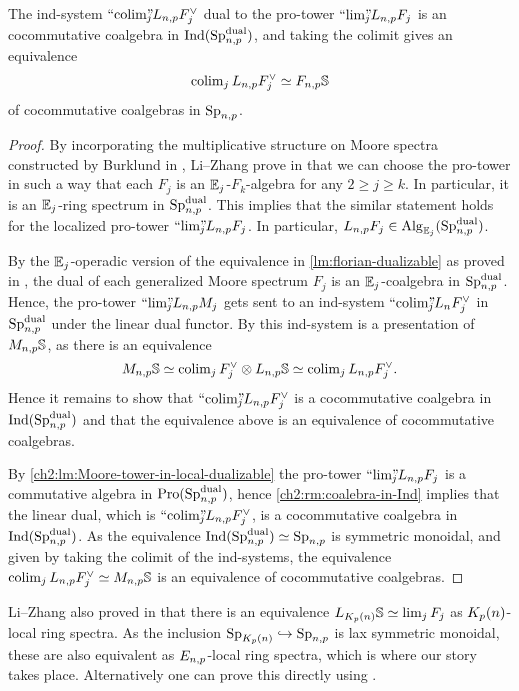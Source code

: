 \begin{lemma}
    \label{ch2:lm:coalgebra-ind-presentation-of-monochromatic-sphere}
    The ind-system $``\!\operatorname{colim}\!"_{\hspace{-5pt} j} L_{n,p} F_j^\vee$ dual to the pro-tower $``\!\lim\!"_{\hspace{-5pt} j} L_{n,p} F_j$ is an cocommutative coalgebra in $\operatorname{Ind}(\mathrm{Sp}_{n,p}^{\mathrm{dual}})$, and taking the colimit gives an equivalence 
    \[\operatorname{colim}_j L_{n,p} F_j^\vee \simeq F_{n,p}\mathbb{S}\] 
    of cocommutative coalgebras in $\mathrm{Sp}_{n,p}$. 
\end{lemma}
\begin{proof}
    By incorporating the multiplicative structure on Moore spectra constructed by Burklund in \cite{burklund_2022}, Li--Zhang prove in \cite[2.1.4]{li-zhang_2023} that we can choose the pro-tower in such a way that each $F_j$ is an $\mathbb{E}_j$-$F_k$-algebra for any $2\geq j \geq k$. In particular, it is an $\mathbb{E}_j$-ring spectrum in $\mathrm{Sp}_{n,p}^{\mathrm{dual}}$. This implies that the similar statement holds for the localized pro-tower $``\!\lim\!"_{\hspace{-5pt} j} L_{n,p} F_j$. In particular, $L_{n,p} F_j \in \operatorname{Alg}_{\mathbb{E}_j}(\mathrm{Sp}_{n,p}^{\mathrm{dual}})$. 
    
    By the $\mathbb{E}_j$-operadic version of the equivalence in \cref{lm:florian-dualizable} as proved in \cite[2.21]{peroux_2022}, the dual of each generalized Moore spectrum $F_j$ is an $\mathbb{E}_j$-coalgebra in $\mathrm{Sp}_{n,p}^{\mathrm{dual}}$. Hence, the pro-tower $``\!\lim\!"_{\hspace{-5pt} j} L_{n,p} M_j$ gets sent to an ind-system $``\!\operatorname{colim}\!"_{\hspace{-5pt} j} L_n F_j^\vee$ in $\mathrm{Sp}_{n,p}^{\mathrm{dual}}$ under the linear dual functor. By \cite[7.10(c)]{hovey-strickland_99} this ind-system is a presentation of $M_{n,p}\mathbb{S}$, as there is an equivalence 
    \[M_{n,p} \mathbb{S} \simeq \operatorname{colim}_j F_j^\vee \otimes L_{n,p}\mathbb{S} \simeq \operatorname{colim}_j L_{n,p} F_j^\vee.\]
    Hence it remains to show that $``\!\operatorname{colim}\!"_{\hspace{-5pt} j} L_{n,p} F_j^\vee$ is a cocommutative coalgebra in $\operatorname{Ind}(\mathrm{Sp}_{n,p}^{\mathrm{dual}})$ and that the equivalence above is an equivalence of cocommutative coalgebras. 

    By \cref{ch2:lm:Moore-tower-in-local-dualizable} the pro-tower $``\!\lim\!"_{\hspace{-5pt} j} L_{n,p} F_j$ is a commutative algebra in $\operatorname{Pro}(\mathrm{Sp}_{n,p}^{\mathrm{dual}})$, hence \cref{ch2:rm:coalebra-in-Ind} implies that the linear dual, which is $``\!\operatorname{colim}\!"_{\hspace{-5pt} j} L_{n,p} F_j^\vee$, is a cocommutative coalgebra in $\operatorname{Ind}(\mathrm{Sp}_{n,p}^{\mathrm{dual}})$. As the equivalence $\operatorname{Ind}(\mathrm{Sp}_{n,p}^{\mathrm{dual}})\simeq \mathrm{Sp}_{n,p}$ is symmetric monoidal, and given by taking the colimit of the ind-systems, the equivalence $\operatorname{colim}_j L_{n,p} F_j^\vee \simeq M_{n,p} \mathbb{S}$ is an equivalence of cocommutative coalgebras.  
\end{proof}

\begin{remark}
    Li--Zhang also proved in \cite[2.1.5]{li-zhang_2023} that there is an equivalence $L_{K_p(n)}\mathbb{S} \simeq \lim_j F_j$ as ${K_p(n)}$-local ring spectra. As the inclusion $\mathrm{Sp}_{{K_p(n)}}\hookrightarrow \mathrm{Sp}_{n,p}$ is lax symmetric monoidal, these are also equivalent as $E_{n,p}$-local ring spectra, which is where our story takes place. Alternatively one can prove this directly using \cite[2.1.6]{li-zhang_2023}. 
\end{remark}

